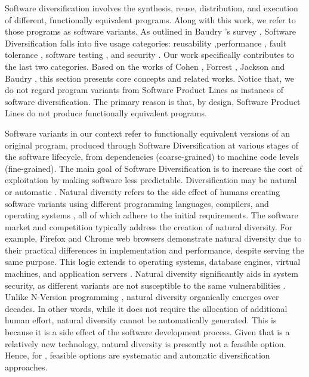 

\label{sota:sw}

Software diversification involves the synthesis, reuse, distribution, and execution of different, functionally equivalent programs.
Along with this work, we refer to those programs as software variants.
As outlined in Baudry \etal's survey \cite{natural_diversity}, Software Diversification falls into five usage categories: reusability \cite{pohl2005software},performance \cite{10.1145/2025113.2025133}, fault tolerance \cite{1659219}, software testing \cite{Chen2010AdaptiveRT}, and security \cite{cohen1993operating}. 
Our work specifically contributes to the last two categories.
Based on the works of Cohen \etal \cite{cohen1993operating}, Forrest \etal \cite{595185}, Jackson \etal \cite{jackson} and Baudry \etal \cite{natural_diversity}, this section presents core concepts and related works.
Notice that, we do not regard program variants from Software Product Lines \cite{10.1145/2580950} as instances of software diversification.
The primary reason is that, by design, Software Product Lines do not produce functionally equivalent programs. 


Software variants in our context refer to functionally equivalent versions of an original program, produced through Software Diversification at various stages of the software lifecycle, from dependencies (coarse-grained) to machine code levels (fine-grained).
The main goal of Software Diversification is to increase the cost of exploitation by making software less predictable. 
Diversification may be natural \cite{natural_diversity} or automatic \cite{offensive_div}. 
Natural diversity refers to the side effect of humans creating software variants using different programming languages, compilers, and operating systems \cite{natural_diversity}, all of which adhere to the initial requirements. 
The software market and competition typically address the creation of natural diversity. 
For example, Firefox and Chrome web browsers demonstrate natural diversity due to their practical differences in implementation and performance, despite serving the same purpose. 
This logic extends to operating systems, database engines, virtual machines, and application servers \cite{natural_diversity}. 
Natural diversity significantly aids in system security, as different variants are not susceptible to the same vulnerabilities \cite{781031, 10.5555/1009382.1009753}. 
Unlike N-Version programming \cite{6312924}, natural diversity organically emerges over decades. 
In other words, while it does not require the allocation of additional human effort, natural diversity cannot be automatically generated. 
This is because it is a side effect of the software development process.
Given that \Wasm is a relatively new technology, natural diversity is presently not a feasible option. 
Hence, for \Wasm, feasible options are systematic and automatic diversification approaches.



